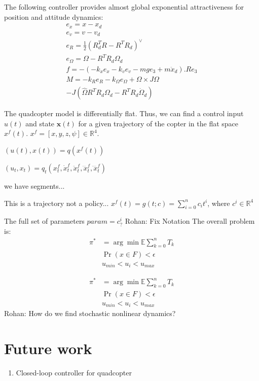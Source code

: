 \documentclass[conference]{IEEEtran}
\newcommand{\rohan}[1]{{\color{blue} Rohan: #1}}
\begin{document}
The following controller \cite{leegeometric} provides almost global exponential attractiveness for position and attitude dynamics:
\begin{gather}
    e_x = x - x_d \\
    e_v = v - v_d \\
    e_R = \frac{1}{2}(R^T_d R - R^T R_d)^{\vee} \\
    e_{\Omega} = \Omega - R^T R_d \Omega_d \\
    f = -(-k_x e_x - k_v e_v - mge_3 + m\ddot{x}_d).Re_3 \\
    \nonumber M = -k_R e_R - k_{\Omega} e_{\Omega} + \Omega \times J\Omega\\ - J (\hat{\Omega} R^T R_d \Omega_d - R^T R_d \dot{\Omega}_d)
\end{gather}

 The quadcopter model is differentially flat. Thus, we can find a control input $u(t)$ and state $\boldsymbol{x}(t)$ for a given trajectory of the copter in the flat space $x^f(t)$. $x^f = [x, y, z, \psi] \in \mathbb{R}^4$. 

$(u(t), x(t)) = q(x^f(t))$

$(u_t, x_t) = q_t(x_t^f,\dot{x}_t^f,\ddot{x}_t^f,\dddot{x}_t^f,\ddddot{x}_t^f)$


we have segments...

This is a trajectory not a policy...
$x^f(t) = g(t;c)=\sum_{i=0}^n c_i t^i$, where $c^i\in\mathbb{R}^4$

The full set of parameters
$param = c^i_?$
\rohan{Fix Notation}
 The overall problem is:
\begin{align}
\pi^{*} &= \arg\min \mathbb{E}\sum_{k=0}^n T_k\\
\nonumber & \Pr(x\in F) < \epsilon \\
\nonumber & u_{min} < u_i < u_{max}
\end{align}


\begin{align}
\pi^{*} &= \arg\min \mathbb{E}\sum_{k=0}^n T_k\\
\nonumber & \Pr(x\in F) < \epsilon \\
\nonumber & u_{min} < u_i < u_{max}
\end{align}
\rohan{How do we find stochastic nonlinear dynamics?} \\

\section{Future work}
\begin{enumerate}
    \item Closed-loop controller for quadcopter
\end{enumerate}

\printbibliography
\end{document}
